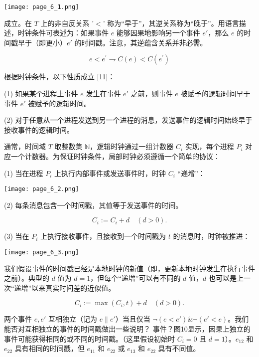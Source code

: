 \documentclass[12pt,a4paper]{report} %
\begin{document}
\begin{center}
\texttt{[image: page\_6\_1.png]}
\end{center}
\begin{center}
成立。在 $T$ 上的非自反关系 '$<$' 称为“早于”，其逆关系称为“晚于”。用语言描述，时钟条件可表述为：如果事件 $e$ 能够因果地影响另一个事件 $e'$，那么 $e$ 的时间戳早于（即更小）$e'$ 的时间戳。注意，其逆蕴含关系并非必需。
\end{center}$$e<e^{\prime} \rightharpoondown C(e)<C\left(e^{\prime}\right)$$

根据时钟条件，以下性质成立 [11]：

(1) 如果某个进程上事件 $e$ 发生在事件 $e'$ 之前，则事件 $e$ 被赋予的逻辑时间早于事件 $e'$ 被赋予的逻辑时间。

(2) 对于任意从一个进程发送到另一个进程的消息，发送事件的逻辑时间始终早于接收事件的逻辑时间。

通常，时间域 $T$ 取整数集 $\mathbb{N}$，逻辑时钟通过一组计数器 $C_i$ 实现，每个进程 $P_i$ 对应一个计数器。为保证时钟条件，局部时钟必须遵循一个简单的协议：

(1) 当在进程 $P_i$ 上执行内部事件或发送事件时，时钟 $C_i$ “递增”：\begin{center}
\texttt{[image: page\_6\_2.png]}
\end{center}
\begin{center}
(2) 每条消息包含一个时间戳，其值等于发送事件的时间。
\end{center}$$C_{i}:=C_{i}+d \quad(d>0).$$

(3) 当在 $P_i$ 上执行接收事件，且接收到一个时间戳为 $t$ 的消息时，时钟被推进：\begin{center}
\texttt{[image: page\_6\_3.png]}
\end{center}
\begin{center}
我们假设事件的时间戳已经是本地时钟的新值（即，更新本地时钟发生在执行事件之前）。典型的 $d$ 值为 $d=1$，但每个“递增”可以有不同的 $d$ 值，$d$ 也可以是上一次“递增”以来真实时间差的近似值。
\end{center}$$C_{i}:=\max \left(C_{i}, t\right)+d \quad(d>0).$$

两个事件 $e, e'$ 互相独立（记为 $e \| e'$）当且仅当 $\neg(e<e') \& \neg(e'<e)$。我们能否对互相独立的事件的时间戳做出一些说明？
事件？图10显示，因果上独立的事件可能获得相同的或不同的时间戳。（这里假设初始时 $C_{i}=0$ 且 $d=1$）。$e_{12}$ 和 $e_{22}$ 具有相同的时间戳，但 $e_{11}$ 和 $e_{22}$ 或 $e_{13}$ 和 $e_{22}$ 具有不同值。
\end{document}
